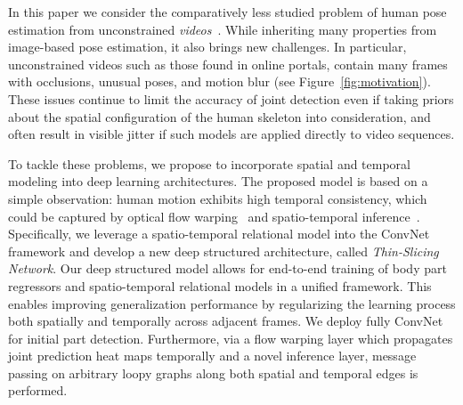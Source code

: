 \documentclass[10pt,twocolumn,letterpaper]{article}
\newcommand{\figref}[1]{Figure~\ref{#1}}
\begin{document}
In this paper we consider the comparatively less studied problem of human pose estimation from unconstrained \emph{videos}~\cite{gkioxari2016chained,pfister2015flowing,zhang2015human,zuffi2013estimating}. While inheriting many properties from image-based pose estimation, it also brings new challenges. In particular, unconstrained videos such as those found in online portals, contain many frames with occlusions, unusual poses, and motion blur (see \figref{fig:motivation}). These issues continue to limit the accuracy of joint detection even if taking priors about the spatial configuration of the human skeleton into consideration, and often result in visible jitter if such models are applied directly to video sequences.

To tackle these problems, we propose to incorporate spatial and temporal modeling into deep learning architectures.
The proposed model is based on a simple observation: human motion exhibits high temporal consistency, which could be captured by optical flow warping~\cite{pfister2015flowing,zhang2015human,zuffi2013estimating} and spatio-temporal inference~\cite{wang2014video,xiaohan2015joint}. Specifically, we leverage a spatio-temporal relational model into the ConvNet framework and develop a new deep structured architecture, called {\em Thin-Slicing Network}.
Our deep structured model allows for end-to-end training of body part regressors and spatio-temporal relational models in a unified framework. This enables improving generalization performance by regularizing the learning process both spatially and temporally across adjacent frames.
We deploy fully ConvNet for initial part detection. Furthermore, via a flow warping layer which propagates joint prediction heat
maps temporally and a novel inference layer, message passing
on arbitrary loopy graphs along both spatial and temporal
edges is performed.


\end{document}
